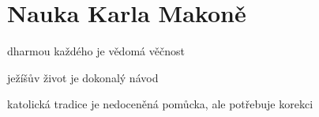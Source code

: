 \chapter{Nauka Karla Makoně}

dharmou každého je vědomá věčnost

ježíšův život je dokonalý návod

katolická tradice je nedoceněná pomůcka, ale potřebuje korekci
